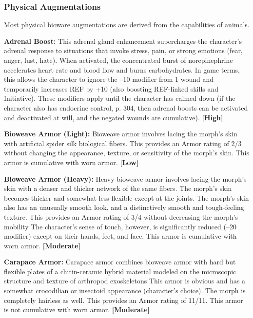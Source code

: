 \subsubsection{Physical Augmentations}

Most physical bioware augmentations are derived 
from the capabilities of animals.

\textbf{Adrenal Boost:} This adrenal gland enhancement 
supercharges the character's adrenal response to 
situations that invoke stress, pain, or strong emotions 
(fear, anger, lust, hate). When activated, the concentrated
burst of norepinephrine accelerates heart rate
and blood flow and burns carbohydrates. In game 
terms, this allows the character to ignore the –10 
modifier from 1 wound and temporarily increases 
REF by +10 (also boosting REF-linked skills and 
Initiative). These modifiers apply until the character 
has calmed down (if the character also has endocrine 
control, p. 304, then adrenal boosts can be activated 
and deactivated at will, and the negated wounds are 
cumulative). \textbf{[High]}

\textbf{Bioweave Armor (Light):} Bioweave armor involves 
lacing the morph's skin with artificial spider silk biological
fibers. This provides an Armor rating of 2/3
without changing the appearance, texture, or sensitivity
of the morph's skin. This armor is cumulative with
worn armor. \textbf{[Low]}

\textbf{Bioweave Armor (Heavy):} Heavy bioweave armor 
involves lacing the morph's skin with a denser and 
thicker network of the same fibers. The  morph's 
skin becomes thicker and somewhat less flexible 
except at the joints. The morph's skin also has an 
unusually smooth look, and a distinctively smooth 
and tough-feeling texture. This provides an Armor 
rating of 3/4 without decreasing the morph's mobility
The character's sense of touch, however, is
significantly reduced (–20 modifier) except on their 
hands, feet, and face. This armor is cumulative with 
worn armor. \textbf{[Moderate]}

\textbf{Carapace Armor:} Carapace armor combines 
bioweave armor with hard but flexible plates of 
a chitin-ceramic hybrid material modeled on the 
microscopic structure and texture of arthropod exoskeletons
This armor is obvious and has a somewhat
crocodilian or insectoid appearance (character's 
choice). The morph is completely hairless as well. This 
provides an Armor rating of 11/11. This armor is not 
cumulative with worn armor. \textbf{[Moderate]}

